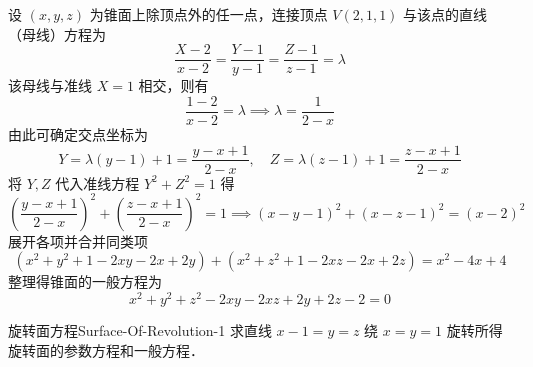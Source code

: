 \begin{solution}
    设 $(x, y, z)$ 为锥面上除顶点外的任一点，连接顶点 $V(2, 1, 1)$ 与该点的直线（母线）方程为
    \begin{equation}
        \frac{X - 2}{x - 2} = \frac{Y - 1}{y - 1} = \frac{Z - 1}{z - 1} = \lambda
    \end{equation}
    该母线与准线 $X = 1$ 相交，则有
    \begin{equation}
        \frac{1 - 2}{x - 2} = \lambda \implies \lambda = \frac{1}{2 - x}
    \end{equation}
    由此可确定交点坐标为
    \begin{equation}
        Y = \lambda(y - 1) + 1 = \frac{y - x + 1}{2 - x}, \quad Z = \lambda(z - 1) + 1 = \frac{z - x + 1}{2 - x}
    \end{equation}
    将 $Y, Z$ 代入准线方程 $Y^2 + Z^2 = 1$ 得
    \begin{equation}
        \left(\frac{y - x + 1}{2 - x}\right)^2 + \left(\frac{z - x + 1}{2 - x}\right)^2 = 1 \implies (x - y - 1)^2 + (x - z - 1)^2 = (x - 2)^2
    \end{equation}
    展开各项并合并同类项
    \begin{equation}
        (x^2 + y^2 + 1 - 2xy - 2x + 2y) + (x^2 + z^2 + 1 - 2xz - 2x + 2z) = x^2 - 4x + 4
    \end{equation}
    整理得锥面的一般方程为
    \begin{equation}
        \boxed{x^2 + y^2 + z^2 - 2xy - 2xz + 2y + 2z - 2 = 0}
    \end{equation}
\end{solution}


\begin{problem}{旋转面方程}{Surface-Of-Revolution-1}
    求直线 $x - 1 = y = z$ 绕 $x = y = 1$ 旋转所得旋转面的参数方程和一般方程．
\end{problem}

